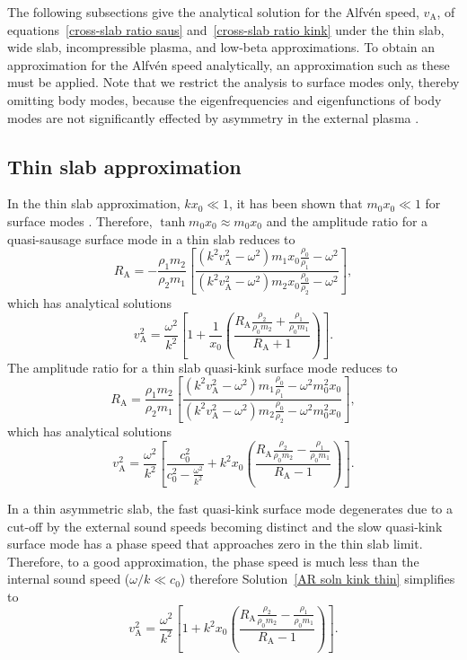 \documentclass[namedreferences]{solarphysics}
\numberwithin{equation}{section}
\begin{document}
\begin{article}
The following subsections give the analytical solution for the Alfv\'{e}n speed, $v_\textrm{A}$, of equations~\eqref{cross-slab ratio saus} and~\eqref{cross-slab ratio kink} under the thin slab, wide slab, incompressible plasma, and low-beta approximations. To obtain an approximation for the Alfv\'{e}n speed analytically, an approximation such as these must be applied. Note that we restrict the analysis to surface modes only, thereby omitting body modes, because the eigenfrequencies and eigenfunctions of body modes are not significantly effected by asymmetry in the external plasma \citep{all_etal17}.


\subsection{Thin slab approximation} \label{sec: AR thin slab}
In the thin slab approximation, $kx_0 \ll 1$, it has been shown that $m_0x_0 \ll 1$ for surface modes \citep{rob81b}. Therefore, $\tanh{m_0x_0} \approx m_0x_0$ and the amplitude ratio for a quasi-sausage surface mode in a thin slab reduces to
\begin{equation}
R_\textrm{A} = -\frac{\rho_1m_2}{\rho_2m_1}\left[\frac{(k^2v_\textrm{A}^2-\omega^2)m_1x_0\frac{\rho_0}{\rho_1}-\omega^2}{(k^2v_\textrm{A}^2-\omega^2)m_2x_0\frac{\rho_0}{\rho_2}-\omega^2}\right], 
\end{equation}
which has analytical solutions
\begin{equation}
v_\textrm{A}^2 = \frac{\omega^2}{k^2} \left[1 + \frac{1}{x_0}\left(\frac{R_\textrm{A}\frac{\rho_2}{\rho_0m_2} + \frac{\rho_1}{\rho_0m_1}}{R_\textrm{A} + 1}\right)\right].
\end{equation}
The amplitude ratio for a thin slab quasi-kink surface mode reduces to
\begin{equation}
R_\textrm{A} = \frac{\rho_1m_2}{\rho_2m_1}\left[\frac{(k^2v_\textrm{A}^2-\omega^2)m_1\frac{\rho_0}{\rho_1}-\omega^2m_0^2x_0}{(k^2v_\textrm{A}^2-\omega^2)m_2\frac{\rho_0}{\rho_2}-\omega^2m_0^2x_0}\right], 
\end{equation}
which has analytical solutions
\begin{equation}
v_\textrm{A}^2 = \frac{\omega^2}{k^2} \left[\frac{c_0^2}{c_0^2 - \frac{\omega^2}{k^2}} + k^2x_0\left(\frac{R_\textrm{A}\frac{\rho_2}{\rho_0m_2} - \frac{\rho_1}{\rho_0m_1}}{R_\textrm{A} - 1}\right)\right]. \label{AR soln kink thin}
\end{equation}

In a thin asymmetric slab, the fast quasi-kink surface mode degenerates due to a cut-off by the external sound speeds becoming distinct \citep{all_etal17} and the slow quasi-kink surface mode has a phase speed that approaches zero in the thin slab limit. Therefore, to a good approximation, the phase speed is much less than the internal sound speed ($\omega/k \ll c_0$) therefore Solution~\eqref{AR soln kink thin} simplifies to
\begin{equation}
v_\textrm{A}^2 = \frac{\omega^2}{k^2} \left[1 + k^2x_0\left(\frac{R_\textrm{A}\frac{\rho_2}{\rho_0m_2} - \frac{\rho_1}{\rho_0m_1}}{R_\textrm{A} - 1}\right)\right]. \label{AR soln kink thin simplified}
\end{equation}


\end{article}
\end{document}
